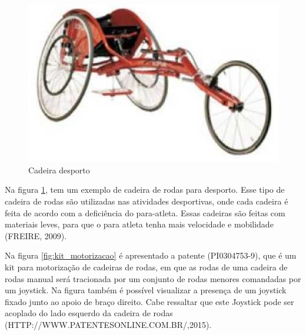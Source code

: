\begin{figure}[!htb]
  \centering
  \includegraphics[keepaspectratio=true,scale=0.50]{figuras/introducao/cadeira_desporte}
  \caption{Cadeira desporto}
  \label{fig:desporto}
\end{figure}


Na figura \ref{fig:desporto}, tem um exemplo de cadeira de rodas para desporto. Esse tipo de cadeira de rodas são utilizadas nas atividades desportivas, onde cada cadeira é feita de acordo com a deficiência do para-atleta. Essas cadeiras são feitas com materiais leves, para que o para atleta tenha mais velocidade e mobilidade (FREIRE, 2009).

Na figura \ref{fig:kit_motorizacao} é apresentado a patente (PI0304753-9), que é um kit para motorização de cadeiras de rodas, em que as rodas de uma cadeira de rodas manual será tracionada por um conjunto de rodas menores comandadas por um joystick. Na figura também é possível visualizar a presença de um joystick fixado junto ao apoio de braço direito. Cabe ressaltar que este Joystick pode ser acoplado do lado esquerdo da cadeira de rodas (HTTP://WWW.PATENTESONLINE.COM.BR/,2015).

